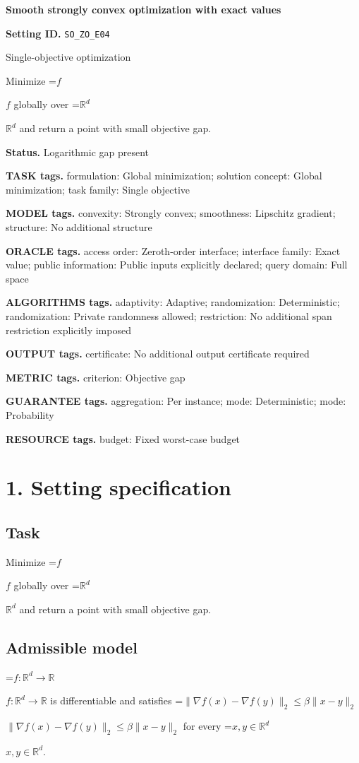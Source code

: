 \documentclass[10pt,a4paper]{article}
\newcommand{\AtlasMath}[1]{\par\begingroup\centering\setbox0=\hbox{$\displaystyle #1$}\ifdim\wd0>1.4\linewidth\typeout{ATLAS WIDE FORMULA: \the\wd0}\fi\ifdim\wd0>\linewidth\resizebox{\linewidth}{!}{\box0}\else\box0\fi\par\endgroup}
\newcommand{\AtlasInlineMath}[1]{\begingroup\setbox0=\hbox{$#1$}\ifdim\wd0>.4\linewidth\endgroup\AtlasMath{#1}\else\endgroup$#1$\fi}
\begin{document}
\raggedright

{\LARGE\bfseries\sffamily\color{AtlasNavy} Smooth strongly convex optimization with exact values\par}\vspace{5pt}
\textbf{Setting ID.} \texttt{SO\_\allowbreak{}ZO\_\allowbreak{}E04}

Single-objective optimization

Minimize \AtlasInlineMath{f} globally over \AtlasInlineMath{\mathbb{R}^d} and return a point with small objective gap.

\textbf{Status.} Logarithmic gap present

\textbf{TASK tags.} formulation: Global minimization; solution concept: Global minimization; task family: Single objective

\textbf{MODEL tags.} convexity: Strongly convex; smoothness: Lipschitz gradient; structure: No additional structure

\textbf{ORACLE tags.} access order: Zeroth-order interface; interface family: Exact value; public information: Public inputs explicitly declared; query domain: Full space

\textbf{ALGORITHMS tags.} adaptivity: Adaptive; randomization: Deterministic; randomization: Private randomness allowed; restriction: No additional span restriction explicitly imposed

\textbf{OUTPUT tags.} certificate: No additional output certificate required

\textbf{METRIC tags.} criterion: Objective gap

\textbf{GUARANTEE tags.} aggregation: Per instance; mode: Deterministic; mode: Probability

\textbf{RESOURCE tags.} budget: Fixed worst-case budget

\section{1. Setting specification}
\subsection{Task}
Minimize \AtlasInlineMath{f} globally over \AtlasInlineMath{\mathbb{R}^d} and return a point with small objective gap.

\subsection{Admissible model}
\AtlasInlineMath{f:\mathbb{R}^d\to\mathbb{R}} is differentiable and satisfies \AtlasInlineMath{\|\nabla f(x)-\nabla f(y)\|_2\le\beta\|x-y\|_2} for every \AtlasInlineMath{x,y\in\mathbb{R}^d}.
\end{document}
